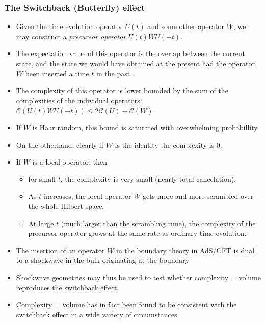 \documentclass[8pt,aspectratio=169]{beamer}
\begin{document}
\begin{frame}
\frametitle{The Switchback (Butterfly) effect}

\begin{itemize}

\item Given the time evolution operator $U(t)$ and some other operator $W$, we may construct a \textit{precursor operator} $U(t) W U(-t)$.

\item The expectation value of this operator is the overlap between the current state, and the state we would have obtained at the present had the operator $W$ been inserted a time $t$ in the past.

\item The complexity of this operator is lower bounded by the sum of the complexities of the individual operators: $\mathcal{C}(U(t)WU(-t))\leq 2 \mathcal{C}(U) + \mathcal{C}(W)$.

\item If $W$ is Haar random, this bound is saturated with overwhelming probabillity.

\item On the otherhand, clearly if $W$ is the identity the complexity is 0.

\item If $W$ is a local operator, then

\begin{itemize}

	\item for small $t$, the complexity is very small (nearly total cancelation).
	
	\item As $t$ increases, the local operator $W$ gets more and more scrambled over the whole Hilbert space.
	
	\item At large $t$ (much larger than the scrambling time), the complexity of the precursor operator grows at the same rate as ordinary time evolution. 

\end{itemize}

\item The insertion of an operator $W$ in the boundary theory in AdS/CFT is dual to a shockwave in the bulk originating at the boundary

\item Shockwave geometries may thus be used to test whether complexity = volume reproduces the switchback effect.

\item Complexity = volume has in fact been found to be consistent with the switchback effect in a wide variety of circumstances.

\end{itemize}

\end{frame}
\end{document}
